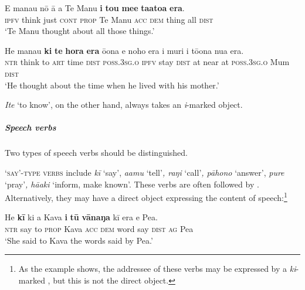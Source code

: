 \ea\label{ex:8.120}
\gll E mana{\ꞌ}u nō {\ꞌ}ā a Te Manu \textbf{i} \textbf{tou} \textbf{me{\ꞌ}e} \textbf{ta{\ꞌ}ato{\ꞌ}a} \textbf{era}. \\
\textsc{ipfv} think just \textsc{cont} \textsc{prop} Te Manu \textsc{acc} \textsc{dem} thing all \textsc{dist} \\

\glt 
‘Te Manu thought about all those things.’ \textstyleExampleref{[R245.011]} 
\z

\ea\label{ex:8.121}
\gll He mana{\ꞌ}u \textbf{ki} \textbf{te} \textbf{hora} \textbf{era} ō{\ꞌ}ona e noho era  {\ꞌ}i muri i tō{\ꞌ}ona nua era.\\
\textsc{ntr} think to \textsc{art} time \textsc{dist} \textsc{poss.3sg.o} \textsc{ipfv} stay \textsc{dist}  at near at \textsc{poss.3sg.o} Mum \textsc{dist}\\

\glt
‘He thought about the time when he lived with his mother.’ \textstyleExampleref{[R245.003]} 
\z

\textit{{\ꞌ}Ite} ‘to know’, on the other hand, always takes an \textit{i}{}-marked object.

\subparagraph{Speech verbs} Two types of speech verbs should be distinguished. 

\textsc{‘}\textsc{say’-type verbs} include \textit{kī} ‘say’, \textit{{\ꞌ}a{\ꞌ}amu} ‘tell’\textit{, raŋi} ‘call’\textit{, pāhono} ‘answer’, \textit{pure} ‘pray’\textit{, hā{\ꞌ}aki} ‘inform, make known’. These verbs are often followed by . Alternatively, they may have a direct object expressing the content of speech:\footnote{\label{fn:436}As the example shows, the addressee of these verbs may be expressed by a \textit{ki}{}-marked , but this  is not the direct object.} 

\ea\label{ex:8.122}
\gll He \textbf{kī} ki a Kava \textbf{i} \textbf{tū} \textbf{vānaŋa} kī era e Pea. \\
\textsc{ntr} say to \textsc{prop} Kava \textsc{acc} \textsc{dem} word say \textsc{dist} \textsc{ag} Pea \\

\glt
‘She said to Kava the words said by Pea.’ \textstyleExampleref{[R229.075]} 
\z

